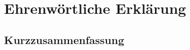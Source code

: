 \documentclass[longdoc,accentcolor=tud1b,11pt,paper=a4]{tudreport}
\title{\adpTitle}
\subtitle{\adpThesisType}
\newcounter{dummy} %
\begin{document}
	\frenchspacing
	\raggedbottom
	\maketitle
	
	\chapter*{Ehrenw\"{o}rtliche Erkl\"{a}rung}
	
	\newpage	
	
	\section*{Kurzzusammenfassung}
	
	\tableofcontents
	\cleardoublepage
    


	
\end{document}
